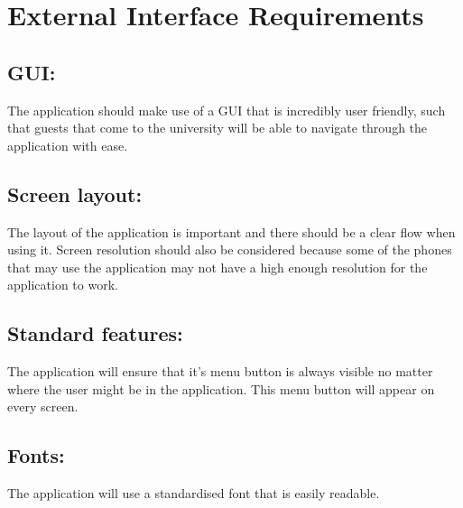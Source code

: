 \documentclass[11pt]{article}
\begin{document}
\section{External Interface Requirements}
\subsection{GUI:}
	The application should make use of a GUI that is incredibly user friendly, such that guests that come to the university will be able to navigate through the application with ease.
\subsection{Screen layout:}
	The layout of the application is important and there should be a clear flow when using it. Screen resolution should also be considered because some of the phones that may use the application may not have a high enough resolution for the application to work.
\subsection{Standard features:}
	The application will ensure that it's menu button is always visible no matter where the user might be in the application. This menu button will appear on every screen.
\subsection{Fonts:}
	The application will use a standardised font that is easily readable.
	
\end{document}
